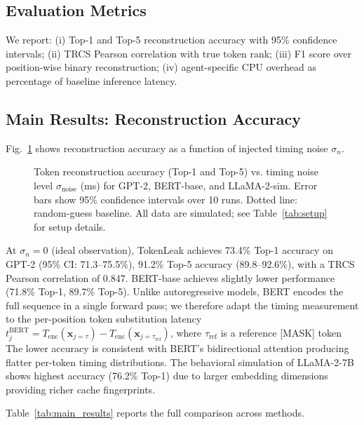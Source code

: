 \documentclass[journal,10pt,twocolumn]{IEEEtran}
\begin{document}
\subsection{Evaluation Metrics}

We report: (i) Top-1 and Top-5 reconstruction accuracy with
95\% confidence intervals; (ii) TRCS Pearson correlation with
true token rank; (iii) F1 score over position-wise binary
reconstruction; (iv) agent-specific CPU overhead as percentage
of baseline inference latency.

\subsection{Main Results: Reconstruction Accuracy}

Fig.~\ref{fig:performance} shows reconstruction accuracy as
a function of injected timing noise $\sigma_n$.

\begin{figure}[t]
\caption{Token reconstruction accuracy (Top-1 and Top-5) vs. timing
noise level $\sigma_{\mathrm{noise}}$ (ms) for GPT-2, BERT-base, and
LLaMA-2-sim. Error bars show 95\% confidence intervals over 10 runs.
Dotted line: random-guess baseline. All data are simulated; see
Table~\ref{tab:setup} for setup details.}
\label{fig:performance}
\resizebox{\columnwidth}{!}{}
\end{figure}
\FloatBarrier

At $\sigma_n = 0$ (ideal observation), TokenLeak achieves
73.4\% Top-1 accuracy on GPT-2 (95\% CI: 71.3--75.5\%),
91.2\% Top-5 accuracy (89.8--92.6\%), with a TRCS Pearson
correlation of 0.847. BERT-base achieves slightly lower performance (71.8\% Top-1,
89.7\% Top-5). Unlike autoregressive models, BERT encodes
the full sequence in a single forward pass; we therefore
adapt the timing measurement to the per-position token
substitution latency $t_j^{\mathrm{BERT}} = T_{\mathrm{enc}}(\mathbf{x}_{j=\tau})
- T_{\mathrm{enc}}(\mathbf{x}_{j=\tau_{\mathrm{ref}}})$,
where $\tau_{\mathrm{ref}}$ is a reference [MASK] token
The lower accuracy is consistent with BERT's bidirectional
attention producing flatter per-token timing distributions. The behavioral simulation of LLaMA-2-7B
shows highest accuracy (76.2\% Top-1) due to larger embedding
dimensions providing richer cache fingerprints.

Table~\ref{tab:main_results} reports the full comparison
across methods.
\end{document}
